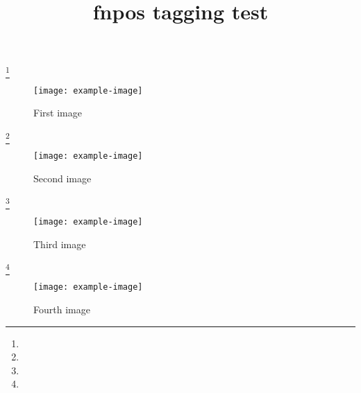 \documentclass[twocolumn]{article} %
\title{fnpos tagging test}
\begin{document}
\kant[1]\footnote{\kant[2]}
\begin{figure}[b]
\texttt{[image: example-image]}
\caption{First image}
\end{figure}
\kant[3]

\kant[4]\footnote{\kant[5]}
\begin{figure}[b]
\texttt{[image: example-image]}
\caption{Second image}
\end{figure}
\kant[6]

\kant[7]\footnote{\kant[8]}
\begin{figure}[b]
\texttt{[image: example-image]}
\caption{Third image}
\end{figure}
\kant[9]

\kant[10]\footnote{\kant[11]}
\begin{figure}[b]
\texttt{[image: example-image]}
\caption{Fourth image}
\end{figure}
\kant[12]
\end{document}
